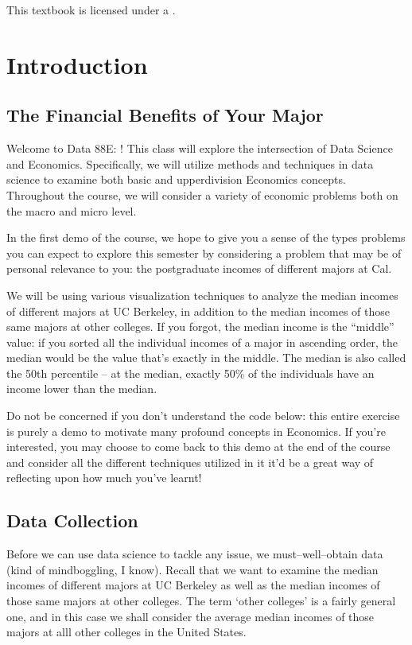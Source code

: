 \documentclass[letterpaper,10pt,english]{jupyterBook}
\begin{document}
\sphinxAtStartPar
This textbook is licensed under a .


\section{Introduction}
\label{\detokenize{content/00-intro/index:introduction}}\label{\detokenize{content/00-intro/index::doc}}

\subsection{The Financial Benefits of Your Major}
\label{\detokenize{content/00-intro/index:the-financial-benefits-of-your-major}}
\sphinxAtStartPar
Welcome to Data 88E: ! This class will explore the intersection of Data Science and Economics.
Specifically, we will utilize methods and techniques in data science to examine both basic and upper\sphinxhyphen{}division Economics concepts.
Throughout the course, we will consider a variety of economic problems both on the macro and micro level.

\sphinxAtStartPar
In the first demo of the course, we hope to give you a sense of the types problems you can expect to explore this semester by considering a problem that may be of personal relevance to you: the post\sphinxhyphen{}graduate incomes of different majors at Cal.

\sphinxAtStartPar
We will be using various visualization techniques to analyze the median incomes of different majors at UC Berkeley, in addition to the median incomes of those same majors at other colleges.
If you forgot, the median income is the “middle” value: if you sorted all the individual incomes of a major in ascending order, the median would be the value that’s exactly in the middle. The median is also called the 50th percentile – at the median, exactly 50\% of the individuals have an income lower than the median.

\sphinxAtStartPar
Do not be concerned if you don’t understand the code below: this entire exercise is purely a demo to motivate many profound concepts in Economics.
If you’re interested, you may choose to come back to this demo at the end of the course and consider all the different techniques utilized in it \sphinxhyphen{} it’d be a great way of reflecting upon how much you’ve learnt!


\subsection{Data Collection}
\label{\detokenize{content/00-intro/index:data-collection}}
\sphinxAtStartPar
Before we can use data science to tackle any issue, we must–well–obtain data (kind of mind\sphinxhyphen{}boggling, I know).
Recall that we want to examine the median incomes of different majors at UC Berkeley as well as the median incomes of those same majors at other colleges.
The term ‘other colleges’ is a fairly general one, and in this case we shall consider the average median incomes of those majors at alll other colleges in the United States.
\end{document}

